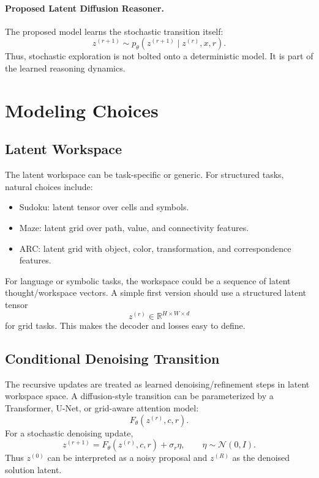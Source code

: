 \documentclass[11pt]{article}
\begin{document}
\paragraph{Proposed Latent Diffusion Reasoner.}
The proposed model learns the stochastic transition itself:
\[
    z^{(r+1)}
    \sim
    p_\theta(z^{(r+1)}\mid z^{(r)},x,r).
\]
Thus, stochastic exploration is not bolted onto a deterministic model. It is part of the learned reasoning dynamics.

\section{Modeling Choices}

\subsection{Latent Workspace}

The latent workspace can be task-specific or generic. For structured tasks, natural choices include:
\begin{itemize}[itemsep=0pt]
    \item Sudoku: latent tensor over cells and symbols.
    \item Maze: latent grid over path, value, and connectivity features.
    \item ARC: latent grid with object, color, transformation, and correspondence features.
\end{itemize}

For language or symbolic tasks, the workspace could be a sequence of latent thought/workspace vectors. A simple first version should use a structured latent tensor
\[
    z^{(r)}\in\mathbb R^{H\times W\times d}
\]
for grid tasks. This makes the decoder and losses easy to define.

\subsection{Conditional Denoising Transition}

The recursive updates are treated as learned denoising/refinement steps in latent workspace space. A diffusion-style transition can be parameterized by a Transformer, U-Net, or grid-aware attention model:
\[
    F_\theta(z^{(r)},c,r).
\]
For a stochastic denoising update,
\[
    z^{(r+1)}
    =
    F_\theta(z^{(r)},c,r)+\sigma_r\eta,
    \qquad
    \eta\sim\mathcal N(0,I).
\]
Thus \(z^{(0)}\) can be interpreted as a noisy proposal and \(z^{(R)}\) as the denoised solution latent.
\end{document}
